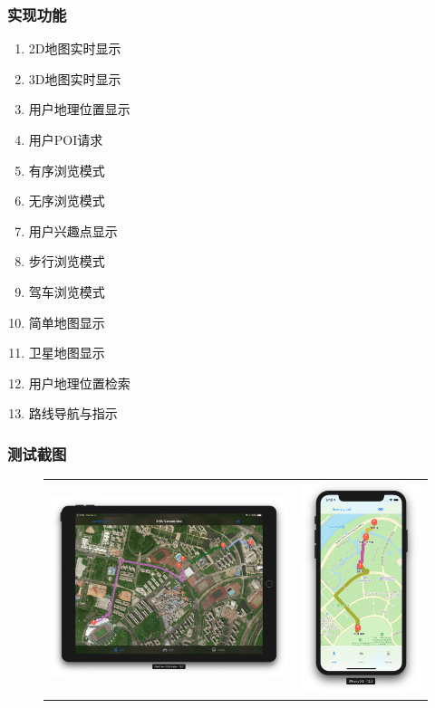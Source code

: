 \documentclass[12pt,UTF8]{ctexart}
\begin{document}
\begin{spacing}{1.4}
\subsubsection{实现功能}
\begin{multicols}{2}
\begin{enumerate}
	\item 2D地图实时显示
	\item 3D地图实时显示
	\item 用户地理位置显示
	\item 用户POI请求
	\item 有序浏览模式
	\item 无序浏览模式
	\item 用户兴趣点显示
	\item 步行浏览模式
	\item 驾车浏览模式
	\item 简单地图显示
	\item 卫星地图显示
	\item 用户地理位置检索
	\item 路线导航与指示
\end{enumerate}
\end{multicols}

\subsubsection{测试截图}
\begin{figure}[H]
\centering
\begin{tabular}{cc}
\includegraphics[width=0.7\linewidth]{fig/ios1.png}&
\includegraphics[width=0.3\linewidth]{fig/ios2.png}
\end{tabular}
\end{figure}


\end{spacing}
\end{document}
